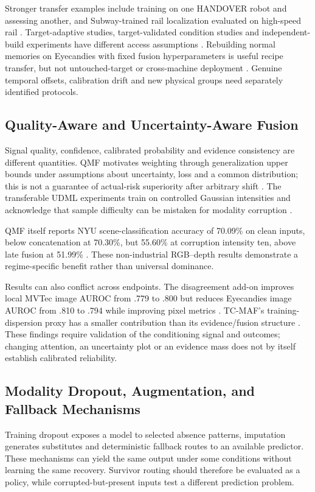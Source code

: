 Stronger transfer examples include training on one HANDOVER robot and assessing another, and Subway-trained rail localization evaluated on high-speed rail \citep[PDF p.~7, Table~V]{Thoduka2024Handover}\citep[PDF p.~10, Table~III]{P031}. Target-adaptive studies, target-validated condition studies and independent-build experiments have different access assumptions \citep{Wang2025A,Chu2024A,Huang2026Rolling,Bevans2023Heterogeneous}. Rebuilding normal memories on Eyecandies with fixed fusion hyperparameters is useful recipe transfer, but not untouched-target or cross-machine deployment \citep{P026,P033}. Genuine temporal offsets, calibration drift and new physical groups need separately identified protocols.

\subsection{Quality-Aware and Uncertainty-Aware Fusion}
Signal quality, confidence, calibrated probability and evidence consistency are different quantities. QMF motivates weighting through generalization upper bounds under assumptions about uncertainty, loss and a common distribution; this is not a guarantee of actual-risk superiority after arbitrary shift \citep[PDF pp.~4--5]{Zhang2023QMF}. The transferable UDML experiments train on controlled Gaussian intensities and acknowledge that sample difficulty can be mistaken for modality corruption \citep[PDF pp.~4--5, 9]{P022}.

QMF itself reports NYU scene-classification accuracy of 70.09\% on clean inputs, below concatenation at 70.30\%, but 55.60\% at corruption intensity ten, above late fusion at 51.99\% \citep[PDF p.~8, Table~1]{Zhang2023QMF}. These non-industrial RGB--depth results demonstrate a regime-specific benefit rather than universal dominance.

Results can also conflict across endpoints. The disagreement add-on improves local MVTec image AUROC from .779 to .800 but reduces Eyecandies image AUROC from .810 to .794 while improving pixel metrics \citep[PDF pp.~10--11, Tables~4--5]{P033}. TC-MAF's training-dispersion proxy has a smaller contribution than its evidence/fusion structure \citep{P026}. These findings require validation of the conditioning signal and outcomes; changing attention, an uncertainty plot or an evidence mass does not by itself establish calibrated reliability.

\subsection{Modality Dropout, Augmentation, and Fallback Mechanisms}
Training dropout exposes a model to selected absence patterns, imputation generates substitutes and deterministic fallback routes to an available predictor. These mechanisms can yield the same output under some conditions without learning the same recovery. Survivor routing should therefore be evaluated as a policy, while corrupted-but-present inputs test a different prediction problem.

